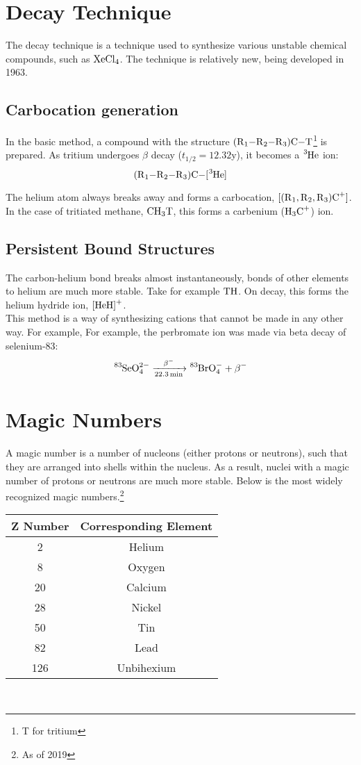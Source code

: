 \documentclass{article}
\begin{document}
\begin{multicols*}{2}
    \section{Decay Technique}
    The decay technique is a technique used to synthesize various unstable chemical
    compounds, such as $\ce{XeCl4}$. The technique is relatively new, being developed
    in 1963.

    \subsection{Carbocation generation}
    In the basic method, a compound with the structure $\ce{(R1-R2-R3)C-T}$\footnote{T for tritium}
    is prepared. As tritium undergoes $\beta$ decay ($t_{1/2} = 12.32$y), it becomes
    a $\ce{^{3}He}$ ion:
    \[
      \ce{(R1-R2-R3)C-[^{3}He]}
    \]

    The helium atom always breaks away and forms a carbocation, $\ce{[(R1,R2,R3)C+]}$.
    In the case of tritiated methane, $\ce{CH3T}$, this forms a carbenium ($\ce{H3C+}$) ion.

    \subsection{Persistent Bound Structures}
    The carbon-helium bond breaks almost instantaneously, bonds of other elements to helium
    are much more stable. Take for example $\ce{TH}$. On decay, this forms the
    helium hydride ion, $\ce{[HeH]+}$.\\

    This method is a way of synthesizing cations that cannot be made in any other way. For example,
    For example, the perbromate ion was made via beta decay of selenium-83:
    \[
      \ce{^{83}SeO^{2-}_{4} ->[\beta-][22.3min] ^{83}BrO^-_4 + \beta-}
    \]

    \section{Magic Numbers}
    A magic number is a number of nucleons (either protons or neutrons), such that they
    are arranged into shells within the nucleus. As a result, nuclei with a magic number of
    protons or neutrons are much more stable. Below is the most widely recognized magic numbers.\footnote{As of 2019}
    
    \begin{tabular}{|c|c|}
      \hline
      \textbf{Z Number} & \textbf{Corresponding Element} \\
      \hline
      2   & Helium  \\
      8   & Oxygen  \\
      20  & Calcium \\
      28  & Nickel  \\
      50  & Tin     \\
      82  & Lead    \\
      126 & Unbihexium \\
      \hline
    \end{tabular}\\



\end{multicols*}
\end{document}
